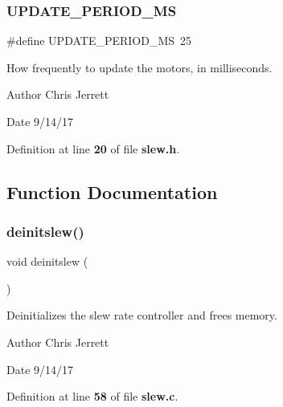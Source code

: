 \mbox{\label{slew_8h_a4e8e7d6fdd1f5c6f8a0f341e4b61f025}} 
\subsubsection{U\+P\+D\+A\+T\+E\+\_\+\+P\+E\+R\+I\+O\+D\+\_\+\+MS}
{\footnotesize\ttfamily \#define U\+P\+D\+A\+T\+E\+\_\+\+P\+E\+R\+I\+O\+D\+\_\+\+MS~25}



How frequently to update the motors, in milliseconds. 

\begin{DoxyAuthor}{Author}
Chris Jerrett 
\end{DoxyAuthor}
\begin{DoxyDate}{Date}
9/14/17 
\end{DoxyDate}


Definition at line \textbf{ 20} of file \textbf{ slew.\+h}.



\subsection{Function Documentation}
\mbox{\label{slew_8h_a981c9990a969d2587e66e550737f7cd9}} 
\subsubsection{deinitslew()}
{\footnotesize\ttfamily void deinitslew (\begin{DoxyParamCaption}{ }\end{DoxyParamCaption})}



Deinitializes the slew rate controller and frees memory. 

\begin{DoxyAuthor}{Author}
Chris Jerrett 
\end{DoxyAuthor}
\begin{DoxyDate}{Date}
9/14/17 
\end{DoxyDate}


Definition at line \textbf{ 58} of file \textbf{ slew.\+c}.




